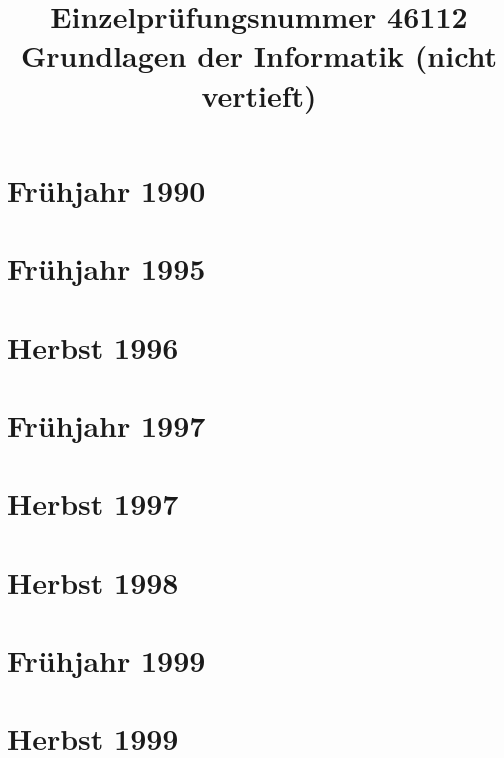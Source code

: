 \documentclass{lehramt-informatik-examen-sammlung}
\title{Einzelprüfungsnummer 46112\\Grundlagen der Informatik (nicht vertieft)}
\begin{document}
\maketitle
\tableofcontents

\section{Frühjahr 1990}


\section{Frühjahr 1995}


\section{Herbst 1996}


\section{Frühjahr 1997}


\section{Herbst 1997}


\section{Herbst 1998}


\section{Frühjahr 1999}


\section{Herbst 1999}

\end{document}
